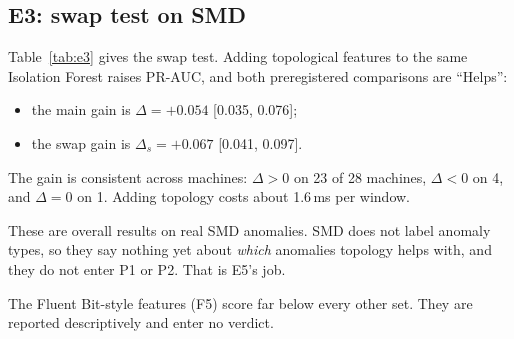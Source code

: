 \subsection{E3: swap test on SMD}
Table~\ref{tab:e3} gives the swap test. Adding topological features to the same Isolation Forest raises PR-AUC, and both preregistered comparisons are ``Helps'':
\begin{itemize}
  \item the main gain is $\Delta = +0.054$ [0.035, 0.076];
  \item the swap gain is $\Delta_s = +0.067$ [0.041, 0.097].
\end{itemize}
The gain is consistent across machines: $\Delta > 0$ on 23 of 28 machines, $\Delta < 0$ on 4, and $\Delta = 0$ on 1. Adding topology costs about 1.6\,ms per window.

These are overall results on real SMD anomalies. SMD does not label anomaly types, so they say nothing yet about \emph{which} anomalies topology helps with, and they do not enter P1 or P2. That is E5's job.

The Fluent Bit-style features (F5) score far below every other set. They are reported descriptively and enter no verdict.


